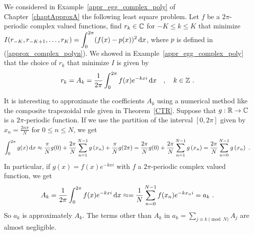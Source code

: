 \begin{rmk}
We considered in Example~\ref{appr_egg_complex_poly} of
Chapter~\ref{chaptApproxA} the following least square problem.
Let $f$ be a $2\pi$-periodic complex valued functions, find $r_k \in \mathbb{C}$ for
$-K\leq k \leq K$ that minimize
$\displaystyle I(r_{-K}, r_{-K+1}, \ldots, r_K) =
\int_0^{2\pi} (f(x)-p(x))^2 \,\mathrm{d}x$,
where $p$ is defined in (\ref{approx_complex_polyn}).  We showed in
Example~\ref{appr_egg_complex_poly} that the choice of $r_k$ that minimize
$I$ is given by
\[
r_k = A_k = \frac{1}{2\pi} \int_0^{2\pi} f(x) e^{-kx i} \,\mathrm{d}x \quad , \quad
k \in \mathbb{Z} \ .
\]

It is interesting to approximate the coefficients $A_k$ using a numerical
method like the composite trapezoidal rule given in Theorem~\ref{CTR}.
Suppose that $g:\mathbb{R} \rightarrow \mathbb{C}$ is a $2\pi$-periodic function.
If we use the partition of the interval $[0,2\pi]$ given by
$\displaystyle x_n = \frac{2n \pi}{N}$ for $0 \leq n \leq N$, we get
\[
\int_0^{2\pi} g(x) \,\mathrm{d}x \approx \frac{\pi}{N}g(0) + \frac{2\pi}{N}
\sum_{n=1}^{N-1} g\left(x_n\right) + \frac{\pi}{N}g(2\pi)
= \frac{2\pi}{N}g(0)
+ \frac{2\pi}{N}\sum_{n=1}^{N-1} g\left(x_n\right)
= \frac{2\pi}{N} \sum_{n=0}^{N-1} g\left(x_n\right) \ .
\]
In particular, if $g(x) = f(x) e^{-k x i}$ with $f$ a $2\pi$-periodic
complex valued function, we get
\[
A_k = \frac{1}{2\pi} \int_0^{2\pi} f(x) e^{-k x i} \dx{x}
\approx = \frac{1}{N} \sum_{n=0}^{N-1} f(x_n) e^{-k x_n i} = a_k \ .
\]
So $a_k$ is approximately $A_k$.  The terms other than $A_k$ in
$\displaystyle a_k = \sum_{j\equiv k \pmod{N}} A_j$ are almost negligible.
\end{rmk}

